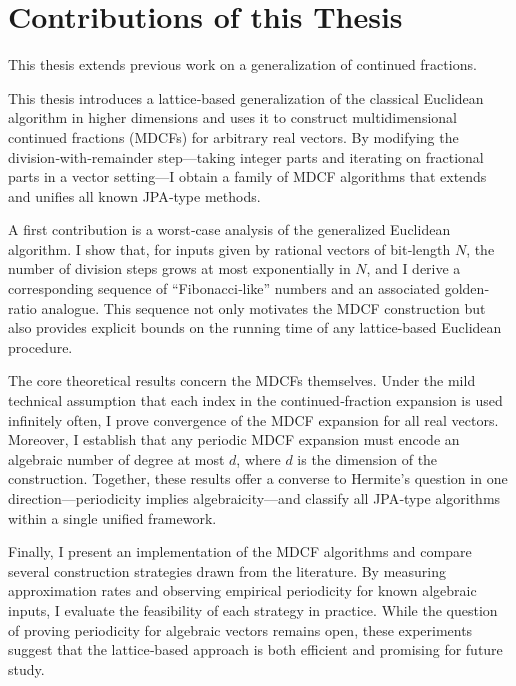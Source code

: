 \section{Contributions of this Thesis}

This thesis extends previous work on a generalization of continued fractions.

This thesis introduces a lattice‐based generalization of the classical Euclidean
algorithm in higher dimensions and uses it to construct multidimensional continued
fractions (MDCFs) for arbitrary real vectors.  By modifying the division‐with‐remainder
step—taking integer parts and iterating on fractional parts in a vector setting—I
obtain a family of MDCF algorithms that extends and unifies all known JPA‐type methods.

A first contribution is a worst‐case analysis of the generalized Euclidean algorithm.
I show that, for inputs given by rational vectors of bit‐length $N$, the number of
division steps grows at most exponentially in $N$, and I derive a corresponding
sequence of “Fibonacci‐like” numbers and an associated golden‐ratio analogue.  This
sequence not only motivates the MDCF construction but also provides explicit bounds
on the running time of any lattice‐based Euclidean procedure.

The core theoretical results concern the MDCFs themselves.  Under the mild technical
assumption that each index in the continued‐fraction expansion is used infinitely
often, I prove convergence of the MDCF expansion for all real vectors.  Moreover,
I establish that any periodic MDCF expansion must encode an algebraic number of
degree at most $d$, where $d$ is the dimension of the construction.  Together,
these results offer a converse to Hermite’s question in one direction—periodicity
implies algebraicity—and classify all JPA‐type algorithms within a single unified
framework.

Finally, I present an implementation of the MDCF algorithms and compare several
construction strategies drawn from the literature.  By measuring approximation
rates and observing empirical periodicity for known algebraic inputs, I evaluate
the feasibility of each strategy in practice.  While the question of proving
periodicity for algebraic vectors remains open, these experiments suggest that
the lattice‐based approach is both efficient and promising for future study.

